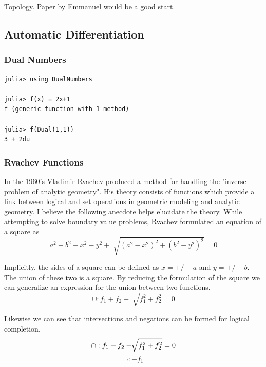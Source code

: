 \documentclass[a4paper]{article}
\begin{document}
Topology. Paper by Emmanuel would be a good start.

\subsection{Automatic Differentiation}

\subsubsection{Dual Numbers}
\begin{lstlisting}
julia> using DualNumbers

julia> f(x) = 2x+1
f (generic function with 1 method)

julia> f(Dual(1,1))
3 + 2du
\end{lstlisting}


\subsubsection{Rvachev Functions}


In the 1960's Vladimir Rvachev produced a method for handling the "inverse
problem of analytic geometry". His theory consists of functions which provide a
link between logical and set operations in geometric modeling and analytic
geometry.\cite{shapiro1991theory} I believe the following anecdote helps
elucidate the theory. While attempting to solve boundary value problems,
Rvachev formulated an equation of a square as
\begin{equation*}
a^2 + b^2 − x^2 − y^2 + \sqrt[]{( a^2 − x^2 )^2 +( b^2 − y^2 )^2} =0
\end{equation*}

Implicitly, the sides of a square can be defined as $x= +/- a$ and $y= +/- b$.
The union of these two is a square. By reducing the formulation of the square
we can generalize an expression for the union between two functions.
\begin{equation*}
\cup : f_1 + f_2 + \sqrt[]{f_1^2 +f_2^2} =0
\end{equation*}

Likewise we can see that intersections and negations can be formed for logical
completion.
\begin{equation*}
\cap : f_1 + f_2 - \sqrt[]{f_1^2 +f_2^2} =0 \\
\end{equation*}
\begin{equation*}
\neg : -f_1
\end{equation*}
\end{document}
